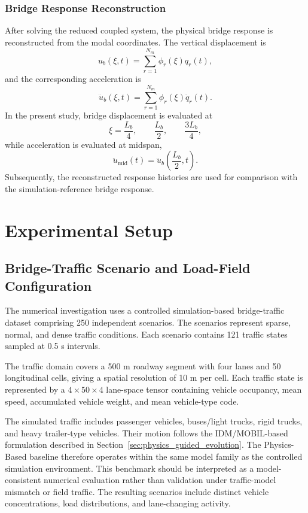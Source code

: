 \documentclass[journal]{IEEEtran}
\begin{document}
\subsubsection{Bridge Response Reconstruction}

After solving the reduced coupled system, the physical bridge response is reconstructed from the modal coordinates. The vertical displacement is
\begin{equation}
u_b(\xi,t)=\sum_{r=1}^{N_m}\phi_r(\xi)q_r(t),
\end{equation}
and the corresponding acceleration is
\begin{equation}
\ddot{u}_b(\xi,t)=\sum_{r=1}^{N_m}\phi_r(\xi)\ddot{q}_r(t).
\end{equation}
In the present study, bridge displacement is evaluated at
\begin{equation}
\xi=\frac{L_b}{4},\qquad\frac{L_b}{2},\qquad\frac{3L_b}{4},
\end{equation}
while acceleration is evaluated at midspan,
\begin{equation}
\ddot{u}_{\mathrm{mid}}(t)=\ddot{u}_b\left(\frac{L_b}{2},t\right).
\end{equation}
Subsequently, the reconstructed response histories are used for comparison with the simulation-reference bridge response.

\section{Experimental Setup}
\subsection{Bridge-Traffic Scenario and Load-Field Configuration}

The numerical investigation uses a controlled simulation-based bridge-traffic dataset comprising 250 independent scenarios. The scenarios represent sparse, normal, and dense traffic conditions. Each scenario contains 121 traffic states sampled at 0.5 s intervals.

The traffic domain covers a 500 m roadway segment with four lanes and 50 longitudinal cells, giving a spatial resolution of 10 m per cell. Each traffic state is represented by a $4\times50\times4$ lane-space tensor containing vehicle occupancy, mean speed, accumulated vehicle weight, and mean vehicle-type code.

The simulated traffic includes passenger vehicles, buses/light trucks, rigid trucks, and heavy trailer-type vehicles. Their motion follows the IDM/MOBIL-based formulation described in Section~\ref{sec:physics_guided_evolution}. The Physics-Based baseline therefore operates within the same model family as the controlled simulation environment. This benchmark should be interpreted as a model-consistent numerical evaluation rather than validation under traffic-model mismatch or field traffic. The resulting scenarios include distinct vehicle concentrations, load distributions, and lane-changing activity.
\end{document}

